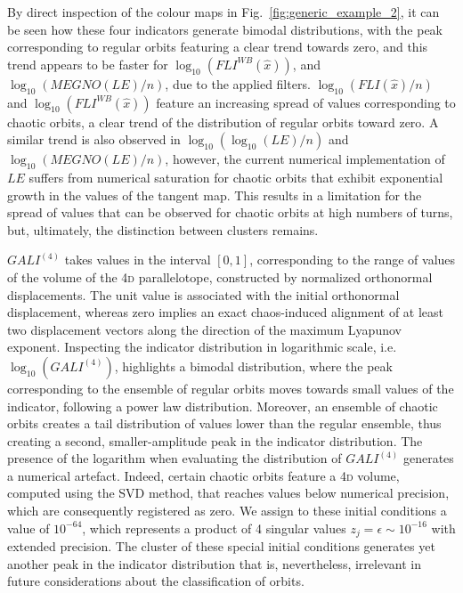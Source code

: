 \begin{chapterappendices}
By direct inspection of the colour maps in Fig.~\ref{fig:generic_example_2}, it can be seen how these four indicators generate bimodal distributions, with the peak corresponding to regular orbits featuring a clear trend towards zero, and this trend appears to be faster for $\log_{10}(FLI^{WB}(\hat{x}))$, and $\log_{10}(MEGNO(LE)/n)$, due to the applied filters. $\log_{10}(FLI(\hat{x})/n)$ and $\log_{10}(FLI^{WB}(\hat{x}))$ feature an increasing spread of values corresponding to chaotic orbits, a clear trend of the distribution of regular orbits toward zero. A similar trend is also observed in $\log_{10}(\log_{10}(LE)/n)$ and $\log_{10}(MEGNO(LE)/n)$, however, the current numerical implementation of $LE$ suffers from numerical saturation for chaotic orbits that exhibit exponential growth in the values of the tangent map. This results in a limitation for the spread of values that can be observed for chaotic orbits at high numbers of turns, but, ultimately, the distinction between clusters remains. 

$GALI^{(4)}$ takes values in the interval $[0,1]$, corresponding to the range of values of the volume of the 4\textsc{d} parallelotope, constructed by normalized orthonormal displacements. The unit value is associated with the initial orthonormal displacement, whereas zero implies an exact chaos-induced alignment of at least two displacement vectors along the direction of the maximum Lyapunov exponent. Inspecting the indicator distribution in logarithmic scale, i.e.~$\log_{10}(GALI^{(4)})$, highlights a bimodal distribution, where the peak corresponding to the ensemble of regular orbits moves towards small values of the indicator, following a power law distribution. Moreover, an ensemble of chaotic orbits creates a tail distribution of values lower than the regular ensemble, thus creating a second, smaller-amplitude peak in the indicator distribution. The presence of the logarithm when evaluating the distribution of $GALI^{(4)}$ generates a numerical artefact. Indeed, certain chaotic orbits feature a 4\textsc{d} volume, computed using the SVD method, that reaches values below numerical precision, which are consequently registered as zero. We assign to these initial conditions a value of $10^{-64}$, which represents a product of 4 singular values $z_j=\epsilon\sim10^{-16}$ with extended precision. The cluster of these special initial conditions generates yet another peak in the indicator distribution that is, nevertheless, irrelevant in future considerations about the classification of orbits. 


\end{chapterappendices}
